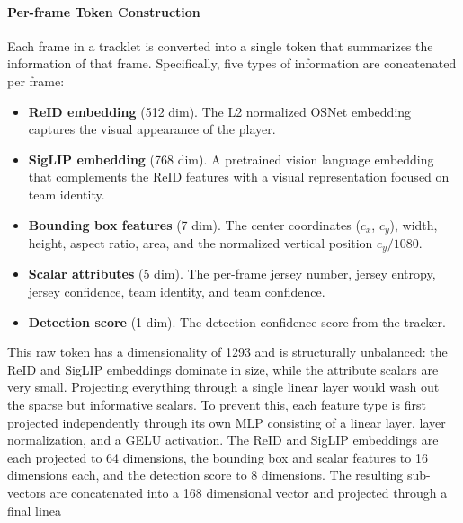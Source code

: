 \paragraph{Per-frame Token Construction}
Each frame in a tracklet is converted into a single token that summarizes the information of that frame. Specifically, five types of information are concatenated per frame:
\begin{itemize}
    \item \textbf{ReID embedding} (512 dim). The L2 normalized OSNet embedding captures the visual appearance of the player.
    \item \textbf{SigLIP embedding} (768 dim). A pretrained vision language embedding that complements the ReID features with a visual representation focused on team identity.
    \item \textbf{Bounding box features} (7 dim). The center coordinates ($c_x$, $c_y$), width, height, aspect ratio, area, and the normalized vertical position $c_y / 1080$.
    \item \textbf{Scalar attributes} (5 dim). The per-frame jersey number, jersey entropy, jersey confidence, team identity, and team confidence.
    \item \textbf{Detection score} (1 dim). The detection confidence score from the tracker.
\end{itemize}

This raw token has a dimensionality of 1293 and is structurally unbalanced: the ReID and SigLIP embeddings dominate in size, while the attribute scalars are very small. Projecting everything through a single linear layer would wash out the sparse but informative scalars. To prevent this, each feature type is first projected independently through its own MLP consisting of a linear layer, layer normalization, and a GELU activation. The ReID and SigLIP embeddings are each projected to 64 dimensions, the bounding box and scalar features to 16 dimensions each, and the detection score to 8 dimensions. The resulting sub-vectors are concatenated into a 168 dimensional vector and projected through a final linea
